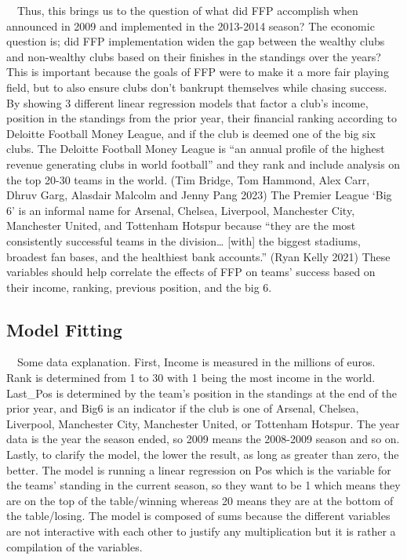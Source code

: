\documentclass[
  12pt,
]{article}
\begin{document}
~~Thus, this brings us to the question of what did FFP accomplish when
announced in 2009 and implemented in the 2013-2014 season? The economic
question is; did FFP implementation widen the gap between the wealthy
clubs and non-wealthy clubs based on their finishes in the standings
over the years? This is important because the goals of FFP were to make
it a more fair playing field, but to also ensure clubs don't bankrupt
themselves while chasing success. By showing 3 different linear
regression models that factor a club's income, position in the standings
from the prior year, their financial ranking according to Deloitte
Football Money League, and if the club is deemed one of the big six
clubs. The Deloitte Football Money League is ``an annual profile of the
highest revenue generating clubs in world football'' and they rank and
include analysis on the top 20-30 teams in the world. (Tim Bridge, Tom
Hammond, Alex Carr, Dhruv Garg, Alasdair Malcolm and Jenny Pang 2023)
The Premier League `Big 6' is an informal name for Arsenal, Chelsea,
Liverpool, Manchester City, Manchester United, and Tottenham Hotspur
because ``they are the most consistently successful teams in the
division\ldots{} {[}with{]} the biggest stadiums, broadest fan bases,
and the healthiest bank accounts.'' (Ryan Kelly 2021) These variables
should help correlate the effects of FFP on teams' success based on
their income, ranking, previous position, and the big 6.

\subsection{Model Fitting}\label{model-fitting}

~~Some data explanation. First, Income is measured in the millions of
euros. Rank is determined from 1 to 30 with 1 being the most income in
the world. Last\_Pos is determined by the team's position in the
standings at the end of the prior year, and Big6 is an indicator if the
club is one of Arsenal, Chelsea, Liverpool, Manchester City, Manchester
United, or Tottenham Hotspur. The year data is the year the season
ended, so 2009 means the 2008-2009 season and so on. Lastly, to clarify
the model, the lower the result, as long as greater than zero, the
better. The model is running a linear regression on Pos which is the
variable for the teams' standing in the current season, so they want to
be 1 which means they are on the top of the table/winning whereas 20
means they are at the bottom of the table/losing. The model is composed
of sums because the different variables are not interactive with each
other to justify any multiplication but it is rather a compilation of
the variables.
\end{document}

